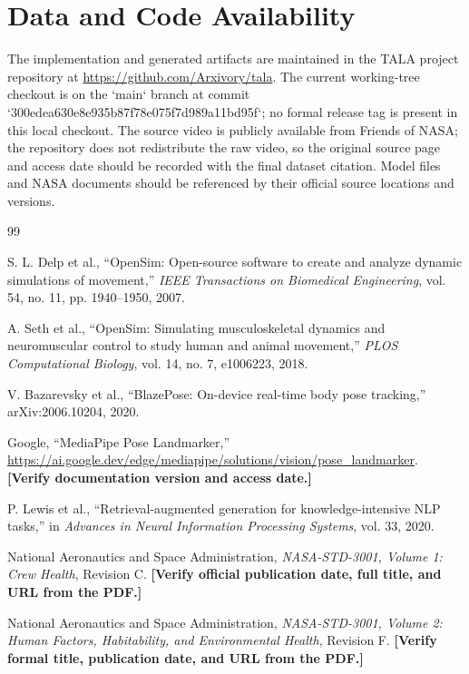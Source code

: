 \documentclass[11pt,a4paper]{article}
\newcommand{\placeholder}[1]{{\color{red}\bfseries[#1]}}
\begin{document}
\section*{Data and Code Availability}
The implementation and generated artifacts are maintained in the TALA project repository at \url{https://github.com/Arxivory/tala}. The current working-tree checkout is on the `main` branch at commit `300edea630e8e935b87f78e075f7d989a11bd95f`; no formal release tag is present in this local checkout. The source video is publicly available from Friends of NASA; the repository does not redistribute the raw video, so the original source page and access date should be recorded with the final dataset citation. Model files and NASA documents should be referenced by their official source locations and versions.

\begin{thebibliography}{99}

S. L. Delp et al.,
``OpenSim: Open-source software to create and analyze dynamic simulations of movement,''
\emph{IEEE Transactions on Biomedical Engineering}, vol. 54, no. 11, pp. 1940--1950, 2007.

A. Seth et al.,
``OpenSim: Simulating musculoskeletal dynamics and neuromuscular control to study human and animal movement,''
\emph{PLOS Computational Biology}, vol. 14, no. 7, e1006223, 2018.

V. Bazarevsky et al.,
``BlazePose: On-device real-time body pose tracking,''
arXiv:2006.10204, 2020.

Google,
``MediaPipe Pose Landmarker,''
\url{https://ai.google.dev/edge/mediapipe/solutions/vision/pose_landmarker}.
\placeholder{Verify documentation version and access date.}

P. Lewis et al.,
``Retrieval-augmented generation for knowledge-intensive NLP tasks,''
in \emph{Advances in Neural Information Processing Systems}, vol. 33, 2020.

National Aeronautics and Space Administration,
\emph{NASA-STD-3001, Volume 1: Crew Health}, Revision C.
\placeholder{Verify official publication date, full title, and URL from the PDF.}

National Aeronautics and Space Administration,
\emph{NASA-STD-3001, Volume 2: Human Factors, Habitability, and Environmental Health}, Revision F.
\placeholder{Verify formal title, publication date, and URL from the PDF.}


\end{thebibliography}
\end{document}
